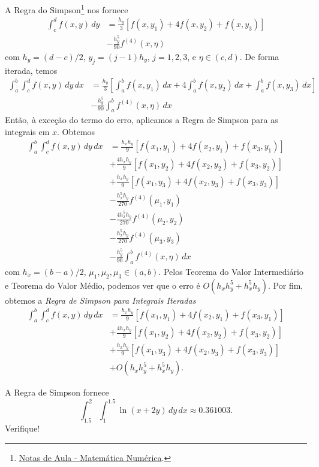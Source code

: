 A Regra do Simpson\footnote{\href{https://phkonzen.github.io/notas/MatematicaNumerica/cap_integr_sec_NC.html}{Notas de Aula - Matemática Numérica}.} nos fornece
\begin{align}
  \int_c^d f(x,y)\,dy &= \frac{h_y}{3}\left[f(x,y_1) + 4f(x,y_2) + f(x,y_3)\right] \\
                      &- \frac{h_y^5}{90}f^{(4)}(x,\eta)
\end{align}
com $h_y = (d-c)/2$, $y_j=(j-1)h_y$, $j=1,2,3$, e $\eta\in (c,d)$. De forma iterada, temos
\begin{align}
  \int_a^b\int_c^d f(x,y)\,dy\,dx &= \frac{h_y}{3}\left[\int_a^bf(x,y_1)\,dx + 4\int_a^bf(x,y_2)\,dx + \int_a^bf(x,y_3)\,dx\right] \\
                                  &- \frac{h_y^5}{90}\int_a^bf^{(4)}(x,\eta)\,dx
\end{align}
Então, à exceção do termo do erro, aplicamos a Regra de Simpson para as integrais em $x$. Obtemos
\begin{align}
  \int_a^b\int_c^d f(x,y)\,dy\,dx &= \frac{h_xh_y}{9}\left[f(x_1,y_1) + 4f(x_2,y_1) + f(x_3,y_1)\right] \\
                                  &+ \frac{4h_xh_y}{9}\left[f(x_1,y_2) + 4f(x_2,y_2) + f(x_3,y_2)\right] \\
                                  &+ \frac{h_xh_y}{9}\left[f(x_1,y_3) + 4f(x_2,y_3) + f(x_3,y_3)\right] \\
                                  &- \frac{h_x^5h_y}{270}f^{(4)}(\mu_1,y_1)\\
                                  &- \frac{4h_x^5h_y}{270}f^{(4)}(\mu_2,y_2)\\
                                  &- \frac{h_x^5h_y}{270}f^{(4)}(\mu_3,y_3) \\
                                  &- \frac{h_y^5}{90}\int_a^bf^{(4)}(x,\eta)\,dx
\end{align}
com $h_x = (b-a)/2$, $\mu_1,\mu_2,\mu_3\in (a,b)$. Pelos Teorema do Valor Intermediário e Teorema do Valor Médio, podemos ver que o erro é $O(h_xh_y^5 + h_x^5h_y)$. Por fim, obtemos a \emph{Regra de Simpson para Integrais Iteradas}
\begin{align}
  \int_a^b\int_c^d f(x,y)\,dy\,dx &= \frac{h_xh_y}{9}\left[f(x_1,y_1) + 4f(x_2,y_1) + f(x_3,y_1)\right] \\
                                  &+ \frac{4h_xh_y}{9}\left[f(x_1,y_2) + 4f(x_2,y_2) + f(x_3,y_2)\right] \\
                                  &+ \frac{h_xh_y}{9}\left[f(x_1,y_3) + 4f(x_2,y_3) + f(x_3,y_3)\right] \\
                                  &+ O(h_xh_y^5 + h_x^5h_y).
\end{align}

\begin{ex}
  A Regra de Simpson fornece
  \begin{equation}
    \int_{1.5}^{2}\int_{1}^{1.5}\ln(x + 2y)\,dy\,dx \approx 0.361003.
  \end{equation}
  Verifique!
\end{ex}
